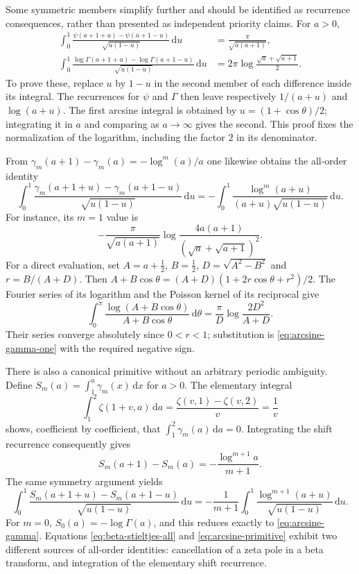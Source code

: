 \documentclass[11pt,a4paper]{article}
\numberwithin{equation}{section}
\theoremstyle{definition}
\theoremstyle{remark}
\newcommand{\dd}{\,\mathrm d}
\begin{document}
Some symmetric members simplify further and should be identified
as recurrence consequences, rather than presented as independent
priority claims. For $a>0$,
\begin{align}
 \int_0^1\frac{\psi(a+1+u)-\psi(a+1-u)}{\sqrt{u(1-u)}}\dd u
 &=\frac{\pi}{\sqrt{a(a+1)}},\label{eq:arcsine-psi}\\
 \int_0^1\frac{\log\Gamma(a+1+u)-\log\Gamma(a+1-u)}
                       {\sqrt{u(1-u)}}\dd u
 &=2\pi\log\frac{\sqrt a+\sqrt{a+1}}2.
 \label{eq:arcsine-gamma}
\end{align}
To prove these, replace $u$ by $1-u$ in the second member of each
difference inside its integral. The recurrences for $\psi$ and
$\Gamma$ then leave respectively $1/(a+u)$ and $\log(a+u)$.
The first arcsine integral is obtained by $u=(1+\cos\theta)/2$;
integrating it in $a$ and comparing as $a\to\infty$ gives the
second. This proof fixes the normalization of the logarithm,
including the factor $2$ in its denominator.

From $\gamma_m(a+1)-\gamma_m(a)=-\log^m(a)/a$ one likewise obtains
the all-order identity
\begin{equation}\label{eq:arcsine-stieltjes}
 \int_0^1\frac{\gamma_m(a+1+u)-\gamma_m(a+1-u)}
                      {\sqrt{u(1-u)}}\dd u
 =-\int_0^1\frac{\log^m(a+u)}{(a+u)\sqrt{u(1-u)}}\dd u.
\end{equation}
For instance, its $m=1$ value is
\begin{equation}\label{eq:arcsine-gamma-one}
 -\frac{\pi}{\sqrt{a(a+1)}}
 \log\frac{4a(a+1)}{(\sqrt a+\sqrt{a+1})^2}.
\end{equation}
For a direct evaluation, set $A=a+\tfrac12$, $B=\tfrac12$,
$D=\sqrt{A^2-B^2}$ and $r=B/(A+D)$. Then
$A+B\cos\theta=(A+D)(1+2r\cos\theta+r^2)/2$.
The Fourier series of its logarithm and the Poisson kernel of its
reciprocal give
\[
 \int_0^\pi\frac{\log(A+B\cos\theta)}{A+B\cos\theta}\dd\theta
 =\frac{\pi}{D}\log\frac{2D^2}{A+D}.
\]
Their series converge absolutely since $0<r<1$; substitution is
\eqref{eq:arcsine-gamma-one} with the required negative sign.

There is also a canonical primitive without an arbitrary periodic
ambiguity. Define
$S_m(a)=\int_1^a\gamma_m(x)\dd x$ for $a>0$.
The elementary integral
\[
 \int_1^2\zeta(1+v,a)\dd a
 =\frac{\zeta(v,1)-\zeta(v,2)}{v}=\frac1v
\]
shows, coefficient by coefficient, that $\int_1^2\gamma_m(a)\dd a=0$.
Integrating the shift recurrence consequently gives
\begin{equation}\label{eq:stieltjes-primitive-recurrence}
 S_m(a+1)-S_m(a)=-\frac{\log^{m+1}a}{m+1}.
\end{equation}
The same symmetry argument yields
\begin{equation}\label{eq:arcsine-primitive}
 \int_0^1\frac{S_m(a+1+u)-S_m(a+1-u)}{\sqrt{u(1-u)}}\dd u
 =-\frac1{m+1}\int_0^1\frac{\log^{m+1}(a+u)}{\sqrt{u(1-u)}}\dd u.
\end{equation}
For $m=0$, $S_0(a)=-\log\Gamma(a)$, and this reduces exactly to
\eqref{eq:arcsine-gamma}. Equations
\eqref{eq:beta-stieltjes-all} and \eqref{eq:arcsine-primitive}
exhibit two different sources of all-order identities: cancellation
of a zeta pole in a beta transform, and integration of the elementary
shift recurrence.
\end{document}
